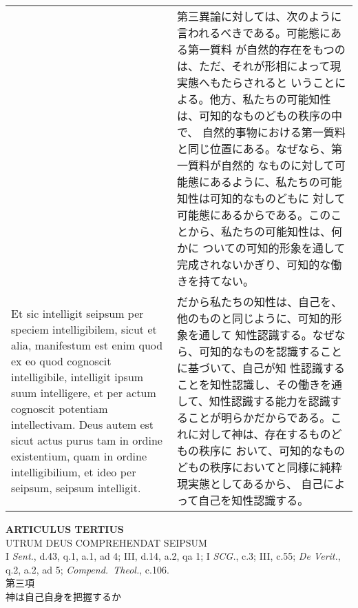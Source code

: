 \documentclass[10pt]{jsarticle} %
\begin{document}
\begin{longtable}{p{21em}p{21em}}
&

第三異論に対しては、次のように言われるべきである。可能態にある第一質料
が自然的存在をもつのは、ただ、それが形相によって現実態へもたらされると
いうことによる。他方、私たちの可能知性は、可知的なものどもの秩序の中で、
自然的事物における第一質料と同じ位置にある。なぜなら、第一質料が自然的
なものに対して可能態にあるように、私たちの可能知性は可知的なものどもに
対して可能態にあるからである。このことから、私たちの可能知性は、何かに
ついての可知的形象を通して完成されないかぎり、可知的な働きを持てない。


\\

Et sic intelligit seipsum per speciem intelligibilem, sicut et alia,
manifestum est enim quod ex eo quod cognoscit intelligibile,
intelligit ipsum suum intelligere, et per actum cognoscit potentiam
intellectivam. Deus autem est sicut actus purus tam in ordine
existentium, quam in ordine intelligibilium, et ideo per seipsum,
seipsum intelligit.


&

だから私たちの知性は、自己を、他のものと同じように、可知的形象を通して
知性認識する。なぜなら、可知的なものを認識することに基づいて、自己が知
性認識することを知性認識し、その働きを通して、知性認識する能力を認識す
ることが明らかだからである。これに対して神は、存在するものどもの秩序に
おいて、可知的なものどもの秩序においてと同様に純粋現実態としてあるから、
自己によって自己を知性認識する。



\end{longtable}
\newpage

\begin{center}
{\Large {\bf ARTICULUS TERTIUS}}\\ {\large UTRUM DEUS COMPREHENDAT
SEIPSUM}\\ {\footnotesize I {\itshape Sent.}, d.43, q.1, a.1, ad 4;
III, d.14, a.2, qa 1; I {\itshape SCG.}, c.3; III, c.55; {\itshape
De Verit.}, q.2, a.2, ad 5; {\itshape Compend.~Theol.}, c.106.}\\
{\Large 第三項\\神は自己自身を把握するか}
\end{center}
\end{document}
